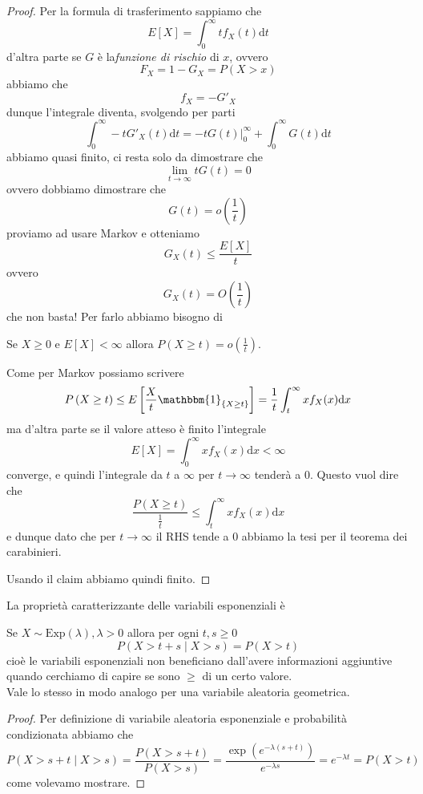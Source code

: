 \documentclass[11pt]{scrartcl}
\newcommand{\dif}{\text{d}}
\begin{document}
	\begin{proof}
		Per la formula di trasferimento sappiamo che
		$$E[X]=\int_0^{\infty}t f_X(t)\dif t$$
		d'altra parte se $G$ è la\textit{funzione di rischio} di $x$, ovvero
		$$F_X=1-G_X=P(X>x)$$
		abbiamo che
		$$f_X=-G'_X$$
		dunque l'integrale diventa, svolgendo per parti
		$$\int_0^\infty -tG'_X(t)\dif t =-tG(t)\bigg|_0^\infty + \int_0^\infty G(t)\dif t$$
		abbiamo quasi finito, ci resta solo da dimostrare che
		$$\lim_{t\to\infty}t G(t)=0$$
		ovvero dobbiamo dimostrare che 
		$$G(t)=o\left(\frac{1}{t}\right)$$
		proviamo ad usare Markov e otteniamo
		$$G_X(t)\le \frac{E[X]}{t}$$
		ovvero
		$$G_X(t)=O\left(\frac{1}{t}\right)$$
		che non basta! Per farlo abbiamo bisogno di 
		\begin{claim}
			Se $X\ge 0$ e $E[X]< \infty$ allora $P(X\ge t)=o\left(\frac{1}{t}\right)$.
		\end{claim}
		\begin{subproof}
			Come per Markov possiamo scrivere
			$$P\left(X\ge t\right)\le E\left[\frac{X}{t}\mathbbm{1}_{\left\{X\ge t\right\}}\right]=\frac{1}{t}\int_t^\infty x f_{X}(x)\dif x$$
			ma d'altra parte se il valore atteso è finito l'integrale 
			$$E[X]=\int_0^\infty x f_{X}(x)\dif x<\infty$$
			converge, e quindi l'integrale da $t$ a $\infty$ per $t\to \infty$ tenderà a $0$. Questo vuol dire che
			$$\frac{P(X\ge t)}{\frac{1}{t}}\le \int_t^\infty xf_X(x)\dif x$$
			e dunque dato che per $t\to\infty $ il RHS tende a $0$ abbiamo la tesi per il teorema dei carabinieri.
		\end{subproof}
		Usando il claim abbiamo quindi finito.
	\end{proof}
	La proprietà caratterizzante delle variabili esponenziali è
	\begin{lemma}
		Se $X\sim \text{Exp}(\lambda),\lambda>0$ allora per ogni $t,s\ge 0$
		$$P\left(X>t+s\mid X>s\right)=P(X>t)$$
		cioè le variabili esponenziali non beneficiano dall'avere informazioni aggiuntive quando cerchiamo di capire se sono $\ge$ di un certo valore. \\
		Vale lo stesso in modo analogo per una variabile aleatoria geometrica.
	\end{lemma}
	\begin{proof}
		Per definizione di variabile aleatoria esponenziale e probabilità condizionata abbiamo che 
		$$P(X>s+t\mid X>s)=\frac{P(X>s+t)}{P(X>s)}=\frac{\exp(e^{-\lambda(s+t)})}{e^{-\lambda s}}=e^{-\lambda t}=P(X>t)$$
		come volevamo mostrare.
	\end{proof}
\end{document}
